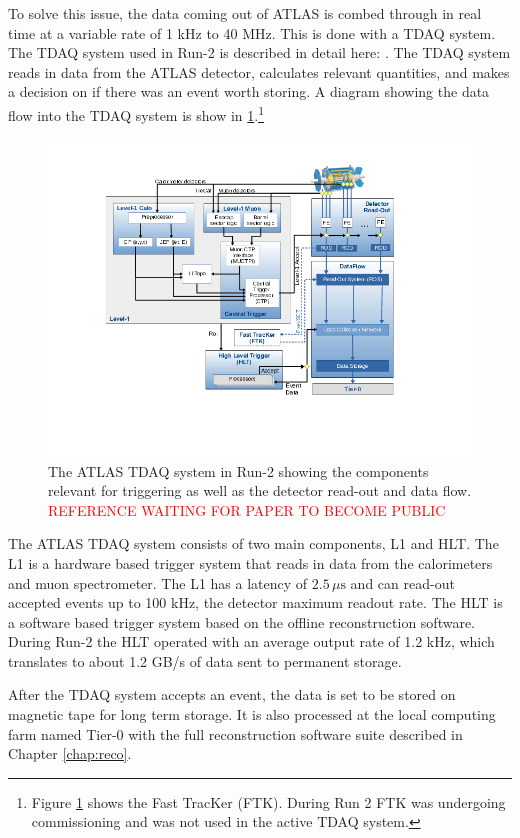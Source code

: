 		To solve this issue, the data coming out of \gls{ATLAS} is combed through in real time at a variable rate of 1 kHz to 40 MHz. This is done with a \gls{TDAQ} system. The \gls{TDAQ} system used in Run-2 is described in detail here: \cite{ATLAS-trigger-Run2}. The \gls{TDAQ} system reads in data from the \gls{ATLAS} detector, calculates relevant quantities, and makes a decision on if there was an event worth storing. A diagram showing the data flow into the \gls{TDAQ} system is show in \ref{fig:trigger-run2}.\footnote{Figure \ref{fig:trigger-run2} shows the Fast TracKer (FTK). During Run 2 FTK was undergoing commissioning and was not used in the active \gls{TDAQ} system.} 
		\begin{figure}[!ht]
		\centering
		\includegraphics[width=\textwidth,keepaspectratio=true]{chapters/chapter3_experiment/images/Trigger_Run2.png}
		\caption{The \gls{ATLAS} \gls{TDAQ} system in Run-2 showing the components relevant for triggering as well as the detector read-out and data flow. \textcolor{red}{REFERENCE WAITING FOR PAPER TO BECOME PUBLIC}}
		\label{fig:trigger-run2}
		\end{figure}
		The \gls{ATLAS} \gls{TDAQ} system consists of two main components, \gls{L1} and \gls{HLT}. The \gls{L1} is a hardware based trigger system that reads in data from the calorimeters and muon spectrometer. The \gls{L1} has a latency of $2.5 \, \mu \mathrm{s}$ and can read-out accepted events up to 100 kHz, the detector maximum readout rate. The \gls{HLT} is a software based trigger system based on the offline reconstruction software. During Run-2 the \gls{HLT} operated with an average output rate of 1.2 kHz, which translates to about 1.2 GB/s of data sent to permanent storage.	

		After the \gls{TDAQ} system accepts an event, the data is set to be stored on magnetic tape for long term storage. It is also processed at the local computing farm named Tier-0 with the full reconstruction software suite described in Chapter \ref{chap:reco}.

